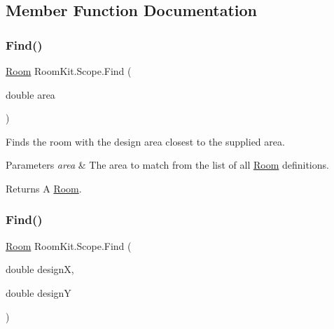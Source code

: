 \subsection{Member Function Documentation}
\mbox{\label{class_room_kit_1_1_scope_a110cfe2a56ee1b74e80727785066f198}} 
\subsubsection{\texorpdfstring{Find()}{Find()}\hspace{0.1cm}{\footnotesize\ttfamily [1/2]}}
{\footnotesize\ttfamily \mbox{\hyperlink{class_room_kit_1_1_room}{Room}} Room\+Kit.\+Scope.\+Find (\begin{DoxyParamCaption}\item[{double}]{area }\end{DoxyParamCaption})}



Finds the room with the design area closest to the supplied area. 


\begin{DoxyParams}{Parameters}
{\em area} & The area to match from the list of all \mbox{\hyperlink{class_room_kit_1_1_room}{Room}} definitions.\\
\hline
\end{DoxyParams}
\begin{DoxyReturn}{Returns}
A \mbox{\hyperlink{class_room_kit_1_1_room}{Room}}. 
\end{DoxyReturn}
\mbox{\label{class_room_kit_1_1_scope_a5891fa17bb22703dedc74dd4f35fb108}} 
\subsubsection{\texorpdfstring{Find()}{Find()}\hspace{0.1cm}{\footnotesize\ttfamily [2/2]}}
{\footnotesize\ttfamily \mbox{\hyperlink{class_room_kit_1_1_room}{Room}} Room\+Kit.\+Scope.\+Find (\begin{DoxyParamCaption}\item[{double}]{designX,  }\item[{double}]{designY }\end{DoxyParamCaption})}



